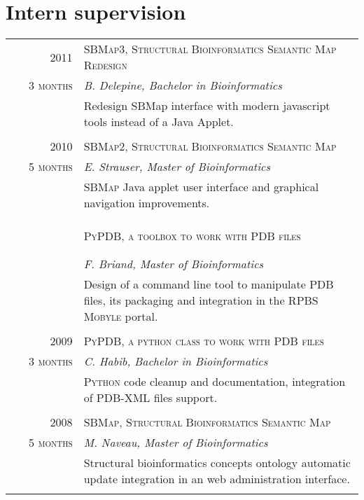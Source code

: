\documentclass[a4paper,10pt]{article}
\begin{document}
\section{Intern supervision}
\begin{tabular}{r|p{11cm}}

  \textsc{2011} & \textsc{SBMap3, Structural Bioinformatics Semantic Map Redesign}\\
  \textsc{3 months} & \emph{B. Delepine, Bachelor in Bioinformatics}\\
  & \footnotesize{Redesign SBMap interface with modern javascript tools instead of a Java Applet.}\\
  \multicolumn{2}{c}{} \\

  \textsc{2010} & \textsc{SBMap2, Structural Bioinformatics Semantic Map}\\
  \textsc{5 months} & \emph{E. Strauser, Master of Bioinformatics}\\
  & \footnotesize{\textsc{SBMap} Java applet user interface and graphical navigation improvements.}\\
  &\\
  \textsc{\textcolor{white}{SUMMER 2010}} & \textsc{PyPDB, a toolbox to work with PDB files}\\
  & \emph{F. Briand, Master of Bioinformatics}\\
  & \footnotesize{Design of a command line tool to manipulate \textsc{PDB} files, its packaging and integration in the RPBS \textsc{Mobyle} portal.}\\
  \multicolumn{2}{c}{} \\

  \textsc{2009} & \textsc{PyPDB, a python class to work with PDB files}\\
  \textsc{3 months} & \emph{C. Habib, Bachelor in Bioinformatics}\\
  & \footnotesize{\textsc{Python} code cleanup and documentation, integration of \textsc{PDB-XML} files support.}\\
  \multicolumn{2}{c}{} \\

  \textsc{2008} & \textsc{SBMap, Structural Bioinformatics Semantic Map}\\
  \textsc{5 months} & \emph{M. Naveau, Master of Bioinformatics}\\
  & \footnotesize{Structural bioinformatics concepts ontology automatic update integration in an web administration interface.}\\
  \multicolumn{2}{c}{} \\

\end{tabular}
\end{document}
